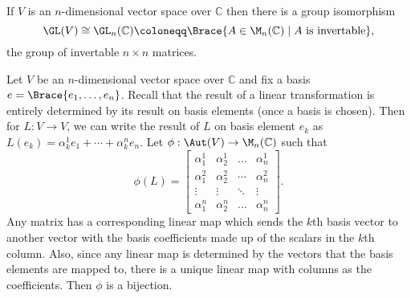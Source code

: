 \begin{prop}
	 If $V$ is an $n$-dimensional vector space over $\mathbb{C}$ then there is a group isomorphism
	$$\GL(V) \cong \GL_n(\mathbb{C}) \coloneqq \Brace{A \in \M_n(\mathbb{C}) \;|\; A \text{ is invertable}},$$
	the group of invertable $n \times n$ matrices.
\end{prop}
\begin{proo*}
	Let $V$ be an $n$-dimensional vector space over $\mathbb{C}$ and fix a basis $e = \Brace{e_1,\dots,e_n}$. Recall that the result of a linear transformation is entirely determined by its result on basis elements (once a basis is chosen). Then for $L : V \to V$, we can write the result of $L$ on basis element $e_k$ as $L(e_k) = \alpha^1_ke_1 + \cdots + \alpha^n_ke_n$. Let $\phi : \Aut(V) \to \M_n(\mathbb{C})$ such that
	$$\phi(L) =
	\begin{bmatrix} 
	    \alpha^1_1 & \alpha^1_2 & \dots & \alpha^1_n \\
	    \alpha^2_1 & \alpha^2_2 & \cdots & \alpha^2_n \\
	    \vdots & \vdots& \ddots & \vdots\\
	    \alpha^n_1 & \alpha^n_2  &\dots & \alpha^n_n 
	\end{bmatrix}.$$
	Any matrix has a corresponding linear map which sends the $k$th basis vector to another vector with the basis coefficients made up of the scalars in the $k$th column. Also, since any linear map is determined by the vectors that the basis elements are mapped to, there is a unique linear map with columns as the coefficients. Then $\phi$ is a bijection.\\


\end{proo*}
